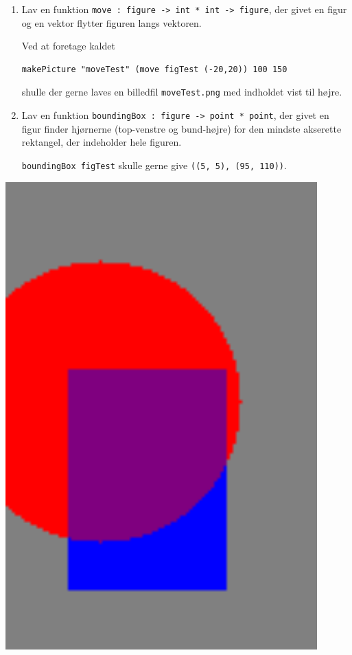 \documentclass[a4paper,12pt]{article}
\begin{document}
\begin{minipage}{.72\textwidth}
\begin{enumerate}[label=8ø.\arabic*,start=6]
\item Lav en funktion \texttt{move : figure -> int * int ->
  figure}, der givet en figur og en vektor flytter figuren langs
  vektoren.

  Ved at foretage kaldet
\begin{verbatim}
makePicture "moveTest" (move figTest (-20,20)) 100 150
\end{verbatim}
  shulle der gerne laves en billedfil \texttt{moveTest.png}
  med indholdet vist til højre.

\item Lav en funktion \texttt{boundingBox : figure -> point *
  point}, der givet en figur finder hjørnerne (top-venstre og
  bund-højre) for den mindste akserette rektangel, der indeholder hele
  figuren.

  \texttt{boundingBox figTest} skulle gerne give \texttt{((5, 5), (95,
    110))}.

\end{enumerate}

\end{minipage} \hfill \begin{minipage}{.2\textwidth}
\includegraphics[width=0.9\textwidth]{moveTest.png}
\end{minipage}
\end{document}
